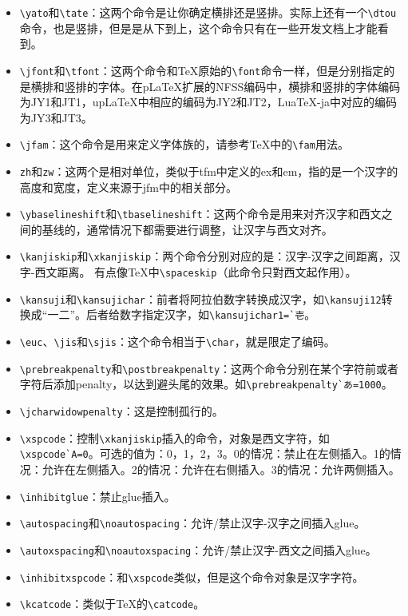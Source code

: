 \begin{itemize}
\item{}{\verb+\yato+}和{\verb+\tate+}：这两个命令是让你确定横排还是竖排。实际上还有一个{\verb+\dtou+}命令，也是竖排，但是是从下到上，这个命令只有在一些开发文档上才能看到。
\item{}{\verb+\jfont+}和{\verb+\tfont+}：这两个命令和TeX原始的{\verb+\font+}命令一样，但是分别指定的是横排和竖排的字体。在{p\LaTeX}扩展的NFSS编码中，横排和竖排的字体编码为JY1和JT1，{up\LaTeX}中相应的编码为JY2和JT2，{Lua\TeX}-ja中对应的编码为JY3和JT3。
\item{}{\verb+\jfam+}：这个命令是用来定义字体族的，请参考{\TeX}中的{\verb+\fam+}用法。
\item{}{\verb+zh+}和{\verb+zw+}：这两个是相对单位，类似于tfm中定义的ex和em，指的是一个汉字的高度和宽度，定义来源于jfm中的相关部分。
\item{}{\verb+\ybaselineshift+}和{\verb+\tbaselineshift+}：这两个命令是用来对齐汉字和西文之间的基线的，通常情况下都需要进行调整，让汉字与西文对齐。
\item{}{\verb+\kanjiskip+}和{\verb+\xkanjiskip+}：两个命令分别对应的是：汉字-汉字之间距离，汉字-西文距离。 有点像{\TeX}中{\verb+\spaceskip+}（此命令只對西文起作用）。
\item{}{\verb+\kansuji+}和{\verb+\kansujichar+}：前者将阿拉伯数字转换成汉字，如{\verb+\kansuji12+}转换成“一二”。后者给数字指定汉字，如{\verb+\kansujichar1=`壱+}。
\item{}{\verb+\euc+}、{\verb+\jis+}和{\verb+\sjis+}：这个命令相当于{\verb+\char+}，就是限定了编码。
\item{}{\verb+\prebreakpenalty+}和{\verb+\postbreakpenalty+}：这两个命令分别在某个字符前或者字符后添加penalty，以达到避头尾的效果。如{\verb+\prebreakpenalty`あ=1000+}。
\item{}{\verb+\jcharwidowpenalty+}：这是控制孤行的。
\item{}{\verb+\xspcode+}：控制{\verb+\xkanjiskip+}插入的命令，对象是西文字符，如{\verb+\xspcode`A=0+}。可选的值为：0，1，2，3。0的情况：禁止在左侧插入。1的情况：允许在左侧插入。2的情况：允许在右侧插入。3的情况：允许两侧插入。
\item{}{\verb+\inhibitglue+}：禁止glue插入。
\item{}{\verb+\autospacing+}和{\verb+\noautospacing+}：允许/禁止汉字-汉字之间插入glue。
\item{}{\verb+\autoxspacing+}和{\verb+\noautoxspacing+}：允许/禁止汉字-西文之间插入glue。
\item{}{\verb+\inhibitxspcode+}：和{\verb+\xspcode+}类似，但是这个命令对象是汉字字符。
\item{}{\verb+\kcatcode+}：类似于TeX的{\verb+\catcode+}。
\end{itemize}


